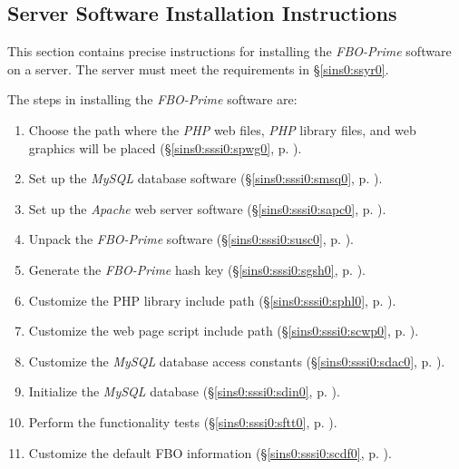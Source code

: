 \documentclass[letterpaper,10pt,titlepage]{article}
\newcommand{\productbasename}{FBO-Prime}
\begin{document}

\subsection{Server Software Installation Instructions}
\label{sins0:sssi0}

This section contains precise instructions for installing the
\emph{\productbasename{}} software on a server.  The server must meet the
requirements in \S{}\ref{sins0:ssyr0}.

The steps in installing the \emph{\productbasename{}}
software are:

\begin{enumerate}
\item Choose the path where the \emph{PHP} web files,
      \emph{PHP} library files, and web graphics will
      be placed (\S{}\ref{sins0:sssi0:spwg0}, p. \pageref{sins0:sssi0:spwg0}).
\item Set up the \emph{MySQL} database software 
      (\S{}\ref{sins0:sssi0:smsq0}, p. \pageref{sins0:sssi0:smsq0}).
\item Set up the \emph{Apache} web server software 
      (\S{}\ref{sins0:sssi0:sapc0}, p. \pageref{sins0:sssi0:sapc0}).
\item Unpack the \emph{\productbasename{}} software 
      (\S{}\ref{sins0:sssi0:susc0}, p. \pageref{sins0:sssi0:susc0}).
\item Generate the \emph{\productbasename{}} hash key
      (\S{}\ref{sins0:sssi0:sgsh0}, p. \pageref{sins0:sssi0:sgsh0}).
\item Customize the PHP library include path
      (\S{}\ref{sins0:sssi0:sphl0}, p. \pageref{sins0:sssi0:sphl0}).
\item Customize the web page script include path
      (\S{}\ref{sins0:sssi0:scwp0}, p. \pageref{sins0:sssi0:scwp0}).
\item Customize the \emph{MySQL} database access constants
      (\S{}\ref{sins0:sssi0:sdac0}, p. \pageref{sins0:sssi0:sdac0}).
\item Initialize the \emph{MySQL} database
      (\S{}\ref{sins0:sssi0:sdin0}, p. \pageref{sins0:sssi0:sdin0}).
\item Perform the functionality tests
      (\S{}\ref{sins0:sssi0:sftt0}, p. \pageref{sins0:sssi0:sftt0}).
\item Customize the default FBO information
      (\S{}\ref{sins0:sssi0:scdf0}, p. \pageref{sins0:sssi0:scdf0}).
\end{enumerate}
\end{document}
